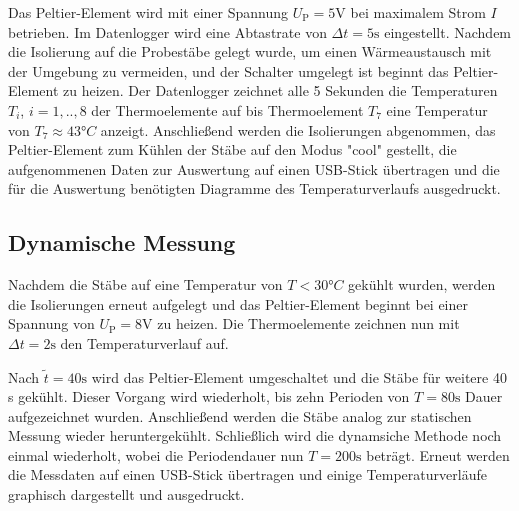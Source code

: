 Das Peltier-Element wird mit einer Spannung $U_\mathup{P}=5 \si{\volt}$ bei maximalem Strom $I$ betrieben. Im Datenlogger wird eine Abtastrate von $\Delta{t}=5\si{\second}$ eingestellt. Nachdem die Isolierung auf die Probestäbe gelegt wurde, um einen Wärmeaustausch mit der Umgebung zu vermeiden, und der Schalter umgelegt ist beginnt das Peltier-Element zu heizen. Der Datenlogger zeichnet alle 5 Sekunden die Temperaturen $T_i$, $i=1,..,8$ der Thermoelemente auf bis Thermoelement $T_7$ eine Temperatur von $T_\mathup{7}\approx 43°C$ anzeigt. Anschließend werden die Isolierungen abgenommen, das Peltier-Element zum Kühlen der Stäbe auf den Modus "cool" gestellt, die aufgenommenen Daten zur Auswertung auf einen USB-Stick übertragen und die für die Auswertung benötigten Diagramme des Temperaturverlaufs ausgedruckt.

\subsection{Dynamische Messung}
Nachdem die Stäbe auf eine Temperatur von $T<30°C$ gekühlt wurden, werden die Isolierungen erneut aufgelegt und das Peltier-Element beginnt bei einer Spannung von $U_\mathup{P}=8 \si{\volt}$ zu heizen. Die Thermoelemente zeichnen nun mit $\Delta{t}=2\si{\second}$ den Temperaturverlauf auf.

Nach $\tilde{t}=40\si\second$ wird das Peltier-Element umgeschaltet und die Stäbe für weitere 40 s gekühlt. Dieser Vorgang wird wiederholt, bis zehn Perioden von $T=80\si\second$ Dauer aufgezeichnet wurden. Anschließend werden die Stäbe analog zur statischen Messung wieder heruntergekühlt. Schließlich wird die dynamsiche Methode noch einmal wiederholt, wobei die Periodendauer nun $T=200\si\second$ beträgt. Erneut werden die Messdaten auf einen USB-Stick übertragen und einige Temperaturverläufe graphisch dargestellt und ausgedruckt.
